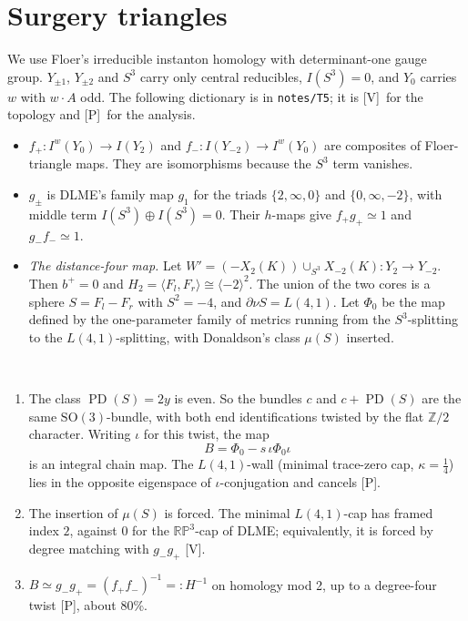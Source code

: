 \documentclass[10pt]{amsart}
\theoremstyle{definition}\newtheorem{definition}[theorem]{Definition}\newtheorem{remark}[theorem]{Remark}
\newcommand{\Z}{\mathbb Z}\newcommand{\Q}{\mathbb Q}\newcommand{\F}{\mathbb F}
\newcommand{\PD}{\operatorname{PD}}\newcommand{\CS}{\operatorname{CS}}
\newcommand{\V}{\textsf{[V]}}\newcommand{\Pl}{\textsf{[P]}}\newcommand{\Sp}{\textsf{[S]}}
\begin{document}
\section{Surgery triangles}\label{sec:triangles}
We use Floer's irreducible instanton homology with determinant-one gauge group. $Y_{\pm1}$, $Y_{\pm2}$ and $S^3$ carry only central reducibles, $I(S^3)=0$, and $Y_0$ carries $w$ with $w\cdot A$ odd. The following dictionary is in \texttt{notes/T5}; it is \V\ for the topology and \Pl\ for the analysis.
\begin{itemize}
\item $f_+\colon I^w(Y_0)\to I(Y_2)$ and $f_-\colon I(Y_{-2})\to I^w(Y_0)$ are composites of Floer-triangle maps. They are isomorphisms because the $S^3$ term vanishes.
\item $g_\pm$ is DLME's family map $g_1$ for the triads $\{2,\infty,0\}$ and $\{0,\infty,-2\}$, with middle term $I(S^3)\oplus I(S^3)=0$. Their $h$-maps give $f_+g_+\simeq1$ and $g_-f_-\simeq1$.
\item \emph{The distance-four map.} Let $W'=(-X_2(K))\cup_{S^3}X_{-2}(K)\colon Y_2\to Y_{-2}$. Then $b^+=0$ and $H_2=\langle F_l,F_r\rangle\cong\langle-2\rangle^2$. The union of the two cores is a sphere $S=F_l-F_r$ with $S^2=-4$, and $\partial\nu S=L(4,1)$. Let $\Phi_0$ be the map defined by the one-parameter family of metrics running from the $S^3$-splitting to the $L(4,1)$-splitting, with Donaldson's class $\mu(S)$ inserted.
\end{itemize}

\begin{proposition}\label{prop:B}
\
\begin{enumerate}
\item The class $\PD(S)=2y$ is even. So the bundles $c$ and $c+\PD(S)$ are the same $\mathrm{SO}(3)$-bundle, with both end identifications twisted by the flat $\Z/2$ character. Writing $\iota$ for this twist, the map
\[
B=\Phi_0-s\,\iota\Phi_0\iota
\]
is an integral chain map. The $L(4,1)$-wall (minimal trace-zero cap, $\kappa=\tfrac14$) lies in the opposite eigenspace of $\iota$-conjugation and cancels \Pl.
\item The insertion of $\mu(S)$ is forced. The minimal $L(4,1)$-cap has framed index $2$, against $0$ for the $\mathbb{RP}^3$-cap of DLME; equivalently, it is forced by degree matching with $g_-g_+$ \V.
\item $B\simeq g_-g_+=(f_+f_-)^{-1}=:H^{-1}$ on homology mod 2, up to a degree-four twist \Pl, about 80\%.
\end{enumerate}
\end{proposition}
\end{document}
